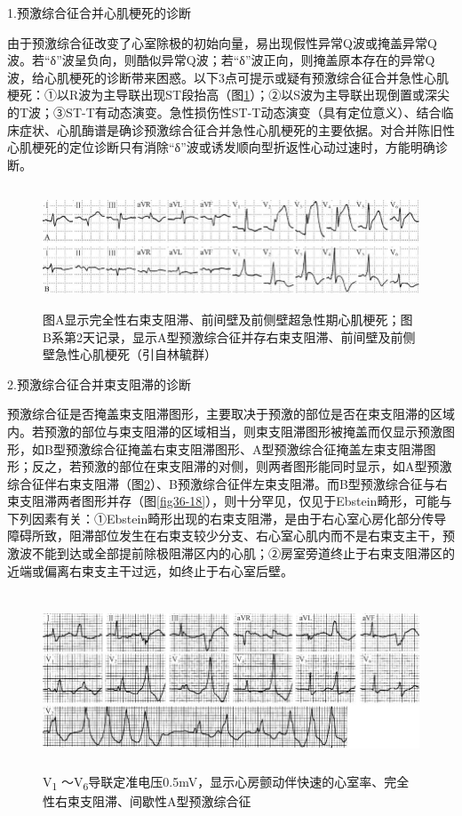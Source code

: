 1.预激综合征合并心肌梗死的诊断

由于预激综合征改变了心室除极的初始向量，易出现假性异常Q波或掩盖异常Q波。若“δ”波呈负向，则酷似异常Q波；若“δ”波正向，则掩盖原本存在的异常Q波，给心肌梗死的诊断带来困惑。以下3点可提示或疑有预激综合征合并急性心肌梗死：①以R波为主导联出现ST段抬高（图\ref{fig36-16}）；②以S波为主导联出现倒置或深尖的T波；③ST-T有动态演变。急性损伤性ST-T动态演变（具有定位意义）、结合临床症状、心肌酶谱是确诊预激综合征合并急性心肌梗死的主要依据。对合并陈旧性心肌梗死的定位诊断只有消除“δ”波或诱发顺向型折返性心动过速时，方能明确诊断。

\begin{figure}[!htbp]
 \centering
 \includegraphics[width=5.73958in,height=1.41667in]{./images/Image00588.jpg}
 \captionsetup{justification=centering}
 \caption{图A显示完全性右束支阻滞、前间壁及前侧壁超急性期心肌梗死；图B系第2天记录，显示A型预激综合征并存右束支阻滞、前间壁及前侧壁急性心肌梗死（引自林毓群）}
 \label{fig36-16}
  \end{figure} 

2.预激综合征合并束支阻滞的诊断

预激综合征是否掩盖束支阻滞图形，主要取决于预激的部位是否在束支阻滞的区域内。若预激的部位与束支阻滞的区域相当，则束支阻滞图形被掩盖而仅显示预激图形，如B型预激综合征掩盖右束支阻滞图形、A型预激综合征掩盖左束支阻滞图形；反之，若预激的部位在束支阻滞的对侧，则两者图形能同时显示，如A型预激综合征伴右束支阻滞（图\ref{fig36-17}）、B预激综合征伴左束支阻滞。而B型预激综合征与右束支阻滞两者图形并存（图\ref{fig36-18}），则十分罕见，仅见于Ebstein畸形，可能与下列因素有关：①Ebstein畸形出现的右束支阻滞，是由于右心室心房化部分传导障碍所致，阻滞部位发生在右束支较少分支、右心室心肌内而不是右束支主干，预激波不能到达或全部提前除极阻滞区内的心肌；②房室旁道终止于右束支阻滞区的近端或偏离右束支主干过远，如终止于右心室后壁。

\begin{figure}[!htbp]
 \centering
 \includegraphics[width=5.78125in,height=2.07292in]{./images/Image00589.jpg}
 \captionsetup{justification=centering}
 \caption{V\textsubscript{1} ～V\textsubscript{6}导联定准电压0.5mV，显示心房颤动伴快速的心室率、完全性右束支阻滞、间歇性A型预激综合征}
 \label{fig36-17}
  \end{figure} 


